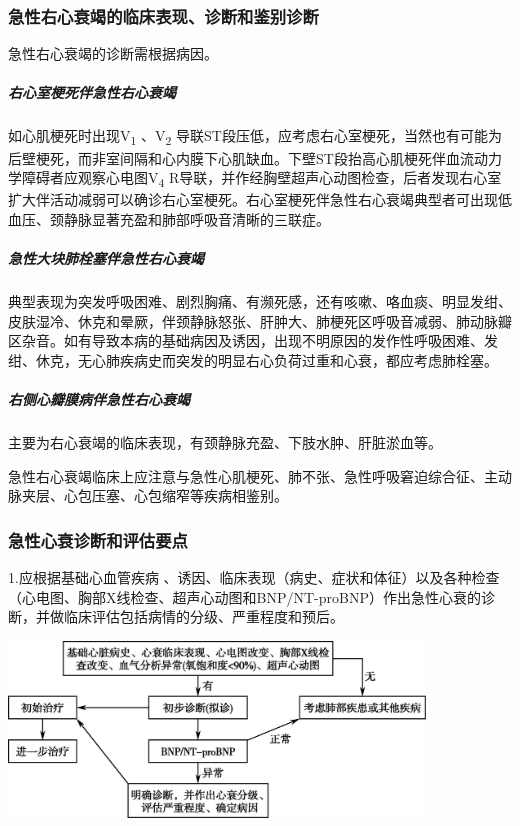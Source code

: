 \subsubsection{急性右心衰竭的临床表现、诊断和鉴别诊断}

急性右心衰竭的诊断需根据病因。

\subparagraph{右心室梗死伴急性右心衰竭}

如心肌梗死时出现V\textsubscript{1} 、V\textsubscript{2}
导联ST段压低，应考虑右心室梗死，当然也有可能为后壁梗死，而非室间隔和心内膜下心肌缺血。下壁ST段抬高心肌梗死伴血流动力学障碍者应观察心电图V\textsubscript{4}
R导联，并作经胸壁超声心动图检查，后者发现右心室扩大伴活动减弱可以确诊右心室梗死。右心室梗死伴急性右心衰竭典型者可出现低血压、颈静脉显著充盈和肺部呼吸音清晰的三联症。

\subparagraph{急性大块肺栓塞伴急性右心衰竭}

典型表现为突发呼吸困难、剧烈胸痛、有濒死感，还有咳嗽、咯血痰、明显发绀、皮肤湿冷、休克和晕厥，伴颈静脉怒张、肝肿大、肺梗死区呼吸音减弱、肺动脉瓣区杂音。如有导致本病的基础病因及诱因，出现不明原因的发作性呼吸困难、发绀、休克，无心肺疾病史而突发的明显右心负荷过重和心衰，都应考虑肺栓塞。

\subparagraph{右侧心瓣膜病伴急性右心衰竭}

主要为右心衰竭的临床表现，有颈静脉充盈、下肢水肿、肝脏淤血等。

急性右心衰竭临床上应注意与急性心肌梗死、肺不张、急性呼吸窘迫综合征、主动脉夹层、心包压塞、心包缩窄等疾病相鉴别。

\subsubsection{急性心衰诊断和评估要点}

1.应根据基础心血管疾病
、诱因、临床表现（病史、症状和体征）以及各种检查（心电图、胸部X线检查、超声心动图和BNP/NT-proBNP）作出急性心衰的诊断，并做临床评估包括病情的分级、严重程度和预后。

\includegraphics[width=4.35417in,height=1.85417in]{./images/Image00109.jpg}

